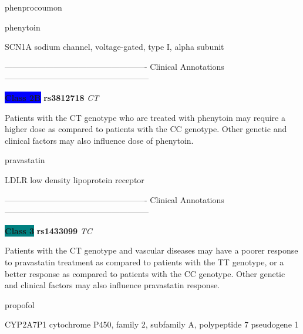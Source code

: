 \documentclass{resume} %
\begin{document}
\begin{rSection}{ phenprocoumon }
\end{rSection}\begin{rSection}{ phenytoin }
\item[]

\begin{rSubsection}{ SCN1A }{ sodium channel, voltage-gated, type I, alpha subunit }{}{}
\item[]

\item[] ---------------------------------------------------- Clinical Annotations -----------------------------------------------------\newline
\item \textbf{\colorbox{blue} {Class 2B}} \textbf{ rs3812718 } \textit{ CT }
\item[] Patients with the CT genotype who are treated with phenytoin may require a higher dose as compared to patients with the CC genotype. Other genetic and clinical factors may also influence dose of phenytoin.
\end{rSubsection}

\end{rSection}\begin{rSection}{ pravastatin }
\item[]

\begin{rSubsection}{ LDLR }{ low density lipoprotein receptor }{}{}
\item[]

\item[] ---------------------------------------------------- Clinical Annotations -----------------------------------------------------\newline
\item \textbf{\colorbox{teal} {Class 3}} \textbf{ rs1433099 } \textit{ TC }
\item[] Patients with the CT genotype and vascular diseases may have a poorer response to pravastatin treatment as compared to patients with the TT genotype, or a better response as compared to patients with the CC genotype. Other genetic and clinical factors may also influence pravastatin response. 
\end{rSubsection}

\end{rSection}\begin{rSection}{ propofol }
\item[]

\begin{rSubsection}{ CYP2A7P1 }{ cytochrome P450, family 2, subfamily A, polypeptide 7 pseudogene 1 }{}{}
\item[]


\end{rSubsection}
\end{rSection}
\end{document}
